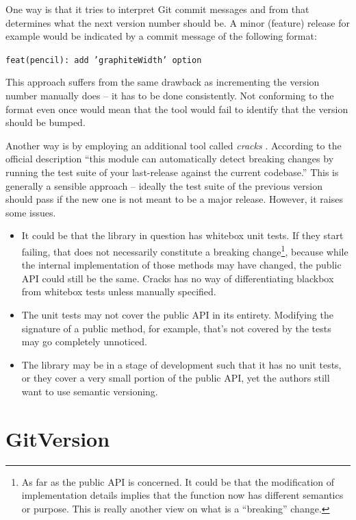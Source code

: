 \documentclass{l4proj}
\begin{document}
One way is that it tries to interpret Git commit messages and from
that determines what the next version number should be. A minor
(feature) release for example would be indicated by a commit message
of the following format:

\begin{center}
\texttt{feat(pencil): add 'graphiteWidth' option}
\end{center}

This approach suffers from the same drawback as incrementing the
version number manually does -- it has to be done consistently.
Not conforming to the format even once would mean that the tool would
fail to identify that the version should be bumped.

Another way is by employing an additional tool called
\textit{cracks} \cite{Cracks}. According to the official description
``this module can automatically detect breaking changes by running the
test suite of your last-release against the current codebase.''
This is generally a sensible approach -- ideally
the test suite of the previous version should pass if the new one is
not meant to be a major release. However, it raises some issues.

\begin{itemize}
\item It could be that the library in question has whitebox unit
tests. If they start failing, that does not necessarily constitute a
breaking change\footnote{As far as the public API is concerned. It
could be that the modification of implementation details implies that
the function now has different semantics or purpose. This is really
another view on what is a ``breaking'' change.}, because while the
internal implementation of
those methods may have changed, the public API could still be the
same. Cracks has no way of differentiating blackbox from whitebox
tests unless manually specified.
\item The unit tests may not cover the public API in its entirety.
Modifying the signature of a public method, for example, that's not
covered by the tests may go completely unnoticed.
\item The library may be in a stage of development such that it has no
unit tests, or they cover a very small portion of the public API, yet
the authors still want to use semantic versioning.
\end{itemize}

\section{GitVersion}
\end{document}
